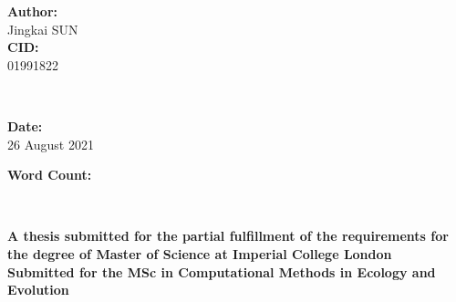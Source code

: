 \begin{titlepage}
    \begin{minipage}{0.4\textwidth}
      \begin{flushleft} \large

      \textbf{Author:}\\
      Jingkai \textsc{SUN} \\

      \textbf{CID:}\\
      01991822



      \end{flushleft}
      \end{minipage}
      ~
      \begin{minipage}{0.5\textwidth}
      \begin{flushright} \large

      \textbf{Date:}\\
      26 August 2021

      \textbf{Word Count:} \\
      \wordcount


      \end{flushright}
    \end{minipage} \\ [5cm]



    \vskip 0.7in
    \par
    \large
    \textbf{A thesis submitted for the partial fulfillment of the requirements for the degree of Master of Science at Imperial College London} \\ [0.5cm]
    \textbf{Submitted for the MSc in Computational Methods in Ecology and Evolution}
    \vfil





    \vfill %

\end{titlepage}
